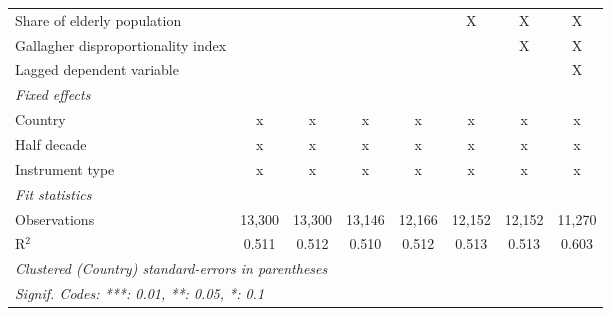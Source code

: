 \begin{tabular}{lccccccc}
   Share of elderly population                                     &                &                &               &               & X             & X             & X\\  
   Gallagher disproportionality index                              &                &                &               &               &               & X             & X\\  
   Lagged dependent variable                                       &                &                &               &               &               &               & X\\  
   \emph{Fixed effects}\\
   Country                                                         & x              & x              & x             & x             & x             & x             & x\\  
   Half decade                                                     & x              & x              & x             & x             & x             & x             & x\\  
   Instrument type                                                 & x              & x              & x             & x             & x             & x             & x\\  
   \midrule \emph{Fit statistics}\\
   Observations                                                    & 13,300         & 13,300         & 13,146        & 12,166        & 12,152        & 12,152        & 11,270\\  
   R$^2$                                                           & 0.511          & 0.512          & 0.510         & 0.512         & 0.513         & 0.513         & 0.603\\  
   \midrule
   \multicolumn{8}{l}{\emph{Clustered (Country) standard-errors in parentheses}}\\
   \multicolumn{8}{l}{\emph{Signif. Codes: ***: 0.01, **: 0.05, *: 0.1}}\\
\end{tabular}
\par\endgroup


